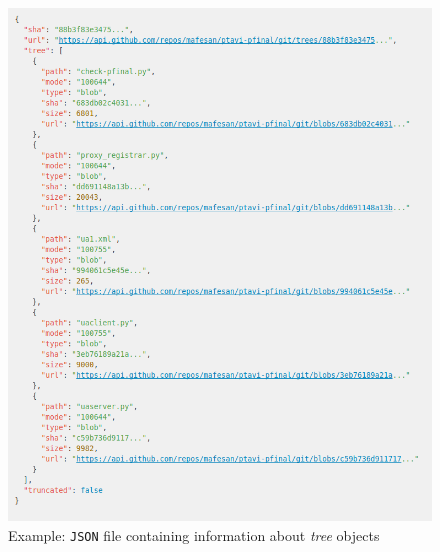 \documentclass[a4paper, 12pt]{book}
\begin{document}
\begin{figure}
  \centering
  \includegraphics[width=15cm, keepaspectratio]{img/gh-api-trees-json-example}
  \caption{Example: \texttt{JSON} file containing information about \textit{tree} objects}
  \label{fig:gh-tree-json}
\end{figure}
\end{document}
